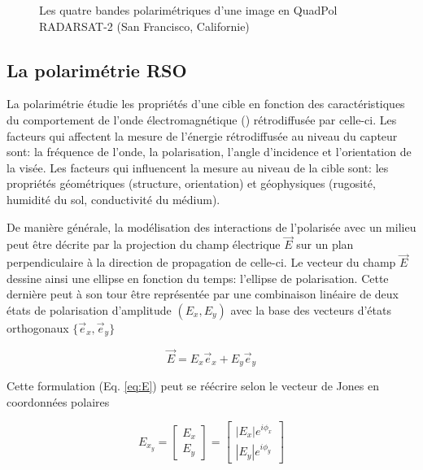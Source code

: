 \begin{figure}[!htbp]
 \caption
        {\small Les quatre bandes polarimétriques d'une image en QuadPol RADARSAT-2 (San Francisco, Californie)} 
        \label{fig:polsar-bands-diagram}
\end{figure}

\subsection{La polarimétrie RSO}

La polarimétrie \acrsar étudie les propriétés d’une cible en fonction des caractéristiques du comportement de l’onde électromagnétique (\acrcroens) rétrodiffusée par celle-ci.  Les facteurs qui affectent la mesure de l’énergie rétrodiffusée au niveau du capteur sont: la fréquence de l’onde, la polarisation, l’angle d’incidence et l’orientation de la visée. Les facteurs qui influencent la mesure au niveau de la cible sont: les propriétés géométriques (structure, orientation) et géophysiques (rugosité, humidité du sol, conductivité du médium).

De manière générale, la modélisation des interactions de l’\acrcroe polarisée avec un milieu peut être décrite par la projection du champ électrique $\Vec{E}$ sur un plan perpendiculaire à la direction de propagation de celle-ci.  Le vecteur du champ $\Vec{E}$ dessine ainsi une ellipse en fonction du temps: l’ellipse de polarisation.  Cette dernière peut à son tour être représentée par une combinaison linéaire de deux états de polarisation d’amplitude $(E_x, E_y)$  avec la base des vecteurs d’états orthogonaux $\{\Vec{e}_x, \Vec{e}_y\}$

\begin{equation}
    \Vec{E}  = E_x \Vec{e}_x + E_y \Vec{e}_y
    \label{eq:E}
\end{equation}

\vspace{10pt}

Cette formulation (Eq. \ref{eq:E}) peut se réécrire selon le vecteur de Jones en coordonnées polaires

\begin{equation}
    E_{x_y}  = \begin{bmatrix} E_x \\ E_y \end{bmatrix} = \begin{bmatrix} |E_x|e^{i {\phi_x}}  \\ |E_y|e^{i {\phi_y}}\end{bmatrix}
    \label{eq:E2}
\end{equation}

